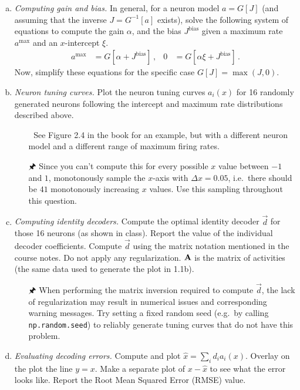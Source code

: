 	\begin{enumerate}[a)]
		\item {} \textit{Computing gain and bias.} In general, for a neuron model $a = G[J]$ (and assuming that the inverse $J = G^{-1}[a]$ exists), solve the following system of equations to compute the gain $\alpha$, and the bias $J^\mathrm{bias}$ given a maximum rate $a^\mathrm{max}$ and an $x$-intercept $\xi$.
		\begin{align*}
			a^\mathrm{max} &= G[\alpha + J^\mathrm{bias}] \,, & 0 &= G[\alpha \xi + J^\mathrm{bias}] \,.
		\end{align*}
		Now, simplify these equations for the specific case $G[J] = \max(J, 0)$.
		\item {} \textit{Neuron tuning curves.} Plot the neuron tuning curves $a_i(x)$ for 16 randomly generated neurons following the intercept and maximum rate distributions described above.
		\begin{itemize}
			\item[{\symbolfont 📖}] See Figure 2.4 in the book for an example, but with a different neuron model and a different range of maximum firing rates.
			\item[{\symbolfont 🖈}] Since you can't compute this for every possible $x$ value between $-1$ and $1$, monotonously sample the $x$-axis with $\Delta x=0.05$, i.e.~there should be $41$ monotonously increasing $x$ values. Use this sampling throughout this question.
		\end{itemize}
		\item {} \textit{Computing identity decoders.} Compute the optimal identity decoder $\vec d$ for those 16 neurons (as shown in class). Report the value of the individual decoder coefficients. Compute $\vec d$ using the matrix notation mentioned in the course notes. Do not apply any regularization. ${\mathbf{A}}$ is the matrix of activities (the same data used to generate the plot in 1.1b).
		\begin{itemize}
			\item[{\symbolfont 🖈}] When performing the matrix inversion required to compute $\vec d$, the lack of regularization may result in numerical issues and corresponding warning messages. Try setting a fixed random seed (e.g.~by calling \texttt{np.random.seed}) to reliably generate tuning curves that do not have this problem.
		\end{itemize}
		\item {} \textit{Evaluating decoding errors.} Compute and plot $\hat{x}=\sum_i d_i a_i(x)$. Overlay on the plot the line $y=x$. Make a separate plot of $x-\hat{x}$ to see what the error looks like. Report the Root Mean Squared Error (RMSE) value.

\end{enumerate}
